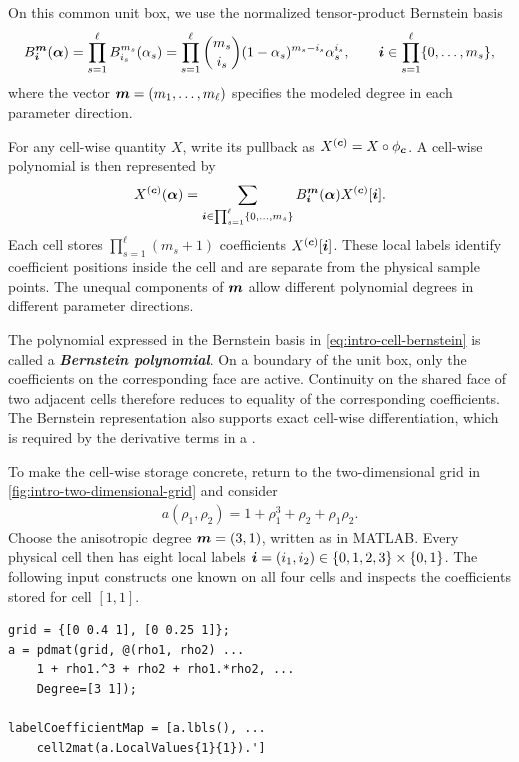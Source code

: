 On this common unit box, we use the normalized tensor-product Bernstein basis
\begin{gather*}
    B_{\boldsymbol{i}}^{\boldsymbol{m}}(\boldsymbol{\alpha})
    =\prod_{s=1}^{\ell}
    B_{i_s}^{m_s}(\alpha_s)
    =\prod_{s=1}^{\ell}\binom{m_s}{i_s}(1-\alpha_s)^{m_s-i_s}\alpha_s^{i_s},
    \qquad
    \boldsymbol{i}\in\prod_{s=1}^{\ell}\{0,\ldots,m_s\},
\end{gather*}
where the vector $\boldsymbol{m}=(m_1,\ldots,m_\ell)$ specifies the modeled degree in each parameter direction.

For any cell-wise quantity $X$, write its pullback as $X^{(\boldsymbol{c})}=X\circ\phi_{\boldsymbol{c}}$. A cell-wise polynomial is then represented by
\begin{gather}
    X^{(\boldsymbol{c})}(\boldsymbol{\alpha})
    =\sum_{\boldsymbol{i}\in\prod_{s=1}^{\ell}\{0,\ldots,m_s\}}
    B_{\boldsymbol{i}}^{\boldsymbol{m}}(\boldsymbol{\alpha})X^{(\boldsymbol{c})}[\boldsymbol{i}].
    \label{eq:intro-cell-bernstein}
\end{gather}
Each cell stores $\prod_{s=1}^{\ell}(m_s+1)$ coefficients $X^{(\boldsymbol{c})}[\boldsymbol{i}]$. These local labels identify coefficient positions inside the cell and are separate from the physical sample points. The unequal components of $\boldsymbol{m}$ allow different polynomial degrees in different parameter directions.

The polynomial expressed in the Bernstein basis in \cref{eq:intro-cell-bernstein} is called a \textbf{\textit{Bernstein polynomial}}. On a boundary of the unit box, only the coefficients on the corresponding face are active. Continuity on the shared face of two adjacent cells therefore reduces to equality of the corresponding coefficients. The Bernstein representation also supports exact cell-wise differentiation, which is required by the derivative terms in a .

To make the cell-wise storage concrete, return to the two-dimensional grid in \cref{fig:intro-two-dimensional-grid} and consider
\begin{gather*}
    a(\rho_1,\rho_2)=1+\rho_1^3+\rho_2+\rho_1\rho_2.
\end{gather*}
Choose the anisotropic degree $\boldsymbol{m}=(3,1)$, written as  in MATLAB. Every physical cell then has eight local labels $\boldsymbol{i}=(i_1,i_2)\in\{0,1,2,3\}\times\{0,1\}$. The following input constructs one known  on all four cells and inspects the coefficients stored for cell $[1,1]$.

\begin{lstlisting}[style=dpmatlab]
grid = {[0 0.4 1], [0 0.25 1]};
a = pdmat(grid, @(rho1, rho2) ...
    1 + rho1.^3 + rho2 + rho1.*rho2, ...
    Degree=[3 1]);

labelCoefficientMap = [a.lbls(), ...
    cell2mat(a.LocalValues{1}{1}).']
\end{lstlisting}

